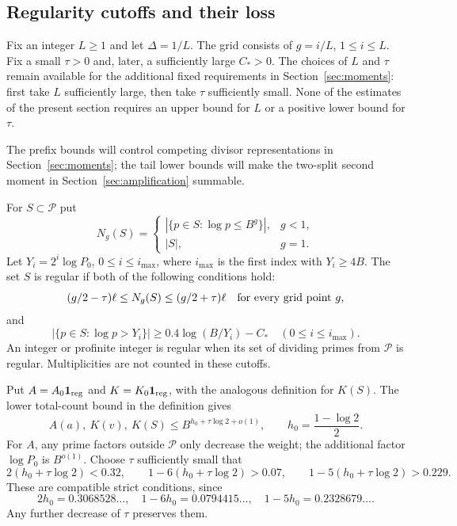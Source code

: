 \subsection{Regularity cutoffs and their loss}

Fix an integer $L\ge1$ and let $\Delta=1/L$.
The grid consists of $g=i/L$, $1\le i\le L$.
Fix a small $\tau>0$ and, later, a sufficiently large $C_*>0$.
The choices of $L$ and $\tau$ remain available for the additional fixed
requirements in Section~\ref{sec:moments}: first take $L$ sufficiently
large, then take $\tau$ sufficiently small.  None of the estimates of the
present section requires an upper bound for $L$ or a positive lower bound
for $\tau$.

The prefix bounds will control competing divisor representations in
Section~\ref{sec:moments}; the tail lower bounds will make the two-split
second moment in Section~\ref{sec:amplification} summable.

\begin{definition}
\label{def:arith-regularity}
For $S\subset\mathcal P$ put
\[
 N_g(S)=\begin{cases}
    |\{p\in S:\log p\le B^g\}|,&g<1,\\
    |S|,&g=1.
 \end{cases}
\]
Let $Y_i=2^i\log P_0$, $0\le i\le i_{\max}$, where $i_{\max}$ is the first
index with $Y_i\ge4B$.  The set $S$ is regular if both of the following
conditions hold:
\[
 (g/2-\tau)\ell\le N_g(S)\le(g/2+\tau)\ell
                       \quad\hbox{for every grid point }g,
\]
and
\[
 |\{p\in S:\log p>Y_i\}|
                 \ge0.4\log(B/Y_i)-C_*
                       \quad(0\le i\le i_{\max}).
\]
An integer or profinite integer is regular when its set of dividing primes
from $\mathcal P$ is regular.  Multiplicities are not counted in these
cutoffs.
\end{definition}

Put $A=A_0\mathbf 1_{\rm reg}$ and $K=K_0\mathbf 1_{\rm reg}$, with the analogous
definition for $K(S)$.  The lower total-count bound in the definition gives
\begin{equation}
 A(a),\ K(v),\ K(S)\le B^{h_0+\tau\log2+o(1)},\qquad
             h_0=\frac{1-\log2}{2}.
 \label{eq:8}
\end{equation}
For $A$, any prime factors outside $\mathcal P$ only decrease the weight;
the additional factor $\log P_0$ is $B^{o(1)}$.
Choose $\tau$ sufficiently small that
\begin{equation}\label{eq:arith-weight-exponents}
 2(h_0+\tau\log2)<0.32,\qquad
 1-6(h_0+\tau\log2)>0.07,\qquad
 1-5(h_0+\tau\log2)>0.229.
\end{equation}
These are compatible strict conditions, since
\[
 2h_0=0.3068528\ldots,\quad
 1-6h_0=0.0794415\ldots,\quad
 1-5h_0=0.2328679\ldots.
\]
Any further decrease of $\tau$ preserves them.

